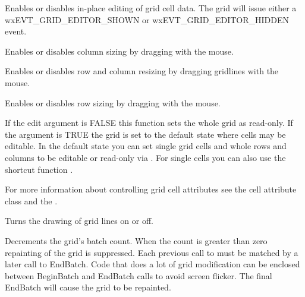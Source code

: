Enables or disables in-place editing of grid cell data. The grid will issue either a
wxEVT\_GRID\_EDITOR\_SHOWN or wxEVT\_GRID\_EDITOR\_HIDDEN event.

\label{wxgridenabledragcolsize}


Enables or disables column sizing by dragging with the mouse.

\label{wxgridenabledraggridsize}


Enables or disables row and column resizing by dragging gridlines with the mouse.

\label{wxgridenabledragrowsize}


Enables or disables row sizing by dragging with the mouse.

\label{wxgridenableediting}


If the edit argument is FALSE this function sets the whole grid as read-only. If the
argument is TRUE the grid is set to the default state where cells may be editable. In the
default state you can set single grid cells and whole rows and columns to be editable or
read-only via 
. For single
cells you can also use the shortcut function 
. 

For more information about controlling grid cell attributes see the 
 cell attribute class and the 
.

\label{wxgridenablegridlines}


Turns the drawing of grid lines on or off.

\label{wxgridendbatch}


Decrements the grid's batch count. When the count is greater than zero repainting of
the grid is suppressed. Each previous call to 
 must be matched by a later call to
EndBatch. Code that does a lot of grid modification can be enclosed between
BeginBatch and EndBatch calls to avoid screen flicker. The final EndBatch will
cause the grid to be repainted.

